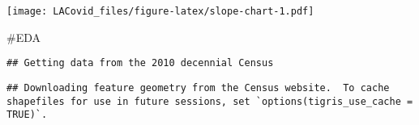 \documentclass[
]{article}
\newenvironment{Shaded}{\begin{snugshade}}{\end{snugshade}}
\newcommand{\DataTypeTok}[1]{\textcolor[rgb]{0.13,0.29,0.53}{#1}}
\newcommand{\DecValTok}[1]{\textcolor[rgb]{0.00,0.00,0.81}{#1}}
\newcommand{\KeywordTok}[1]{\textcolor[rgb]{0.13,0.29,0.53}{\textbf{#1}}}
\newcommand{\NormalTok}[1]{#1}
\newcommand{\OperatorTok}[1]{\textcolor[rgb]{0.81,0.36,0.00}{\textbf{#1}}}
\newcommand{\OtherTok}[1]{\textcolor[rgb]{0.56,0.35,0.01}{#1}}
\newcommand{\StringTok}[1]{\textcolor[rgb]{0.31,0.60,0.02}{#1}}
\begin{document}
\texttt{[image: LACovid\_files/figure-latex/slope-chart-1.pdf]}

\#EDA

\begin{Shaded}
\end{Shaded}

\begin{verbatim}
## Getting data from the 2010 decennial Census
\end{verbatim}

\begin{verbatim}
## Downloading feature geometry from the Census website.  To cache shapefiles for use in future sessions, set `options(tigris_use_cache = TRUE)`.
\end{verbatim}
\end{document}
